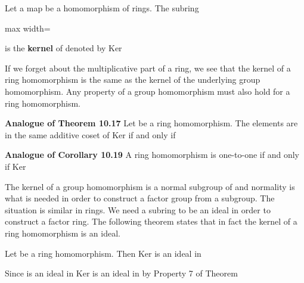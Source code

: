 \documentclass[11pt,oneside]{article}
\begin{document}
\begin{BookBody}

 Let a map  be a homomorphism of rings. The subring

\begin{center}\begin{adjustbox}{max width=\linewidth}\end{adjustbox}\end{center}

\noindent is the\textbf{ kernel} of \BookInline{\phi,\allowbreak } denoted by Ker \BookEnd{\blacksquare}

If we forget about the multiplicative part of a ring, we see that the kernel of a ring homomorphism is the same as the kernel of the underlying group homomorphism. Any property of a group homomorphism must also hold for a ring homomorphism.

 \textbf{Analogue of Theorem 10.17} Let  be a ring homomorphism. The elements  are in the same additive coset of Ker\BookInline{(\phi )} if and only if \BookEnd{\blacklozenge}

 \textbf{Analogue of Corollary 10.19} A ring homomorphism  is one-to-one if and only if Ker\BookEnd{\blacklozenge}

\noindent The kernel of a group homomorphism  is a normal subgroup of  and normality is what is needed in order to construct a factor group from a subgroup. The situation is similar in rings. We need a subring to be an ideal in order to construct a factor ring. The following theorem states that in fact the kernel of a ring homomorphism is an ideal.

 Let  be a ring homomorphism. Then Ker\BookInline{(\phi )} is an ideal in 

 Since  is an ideal in  Ker is an ideal in  by Property 7 of Theorem \BookEnd{\blacklozenge}



\end{BookBody}
\end{document}
